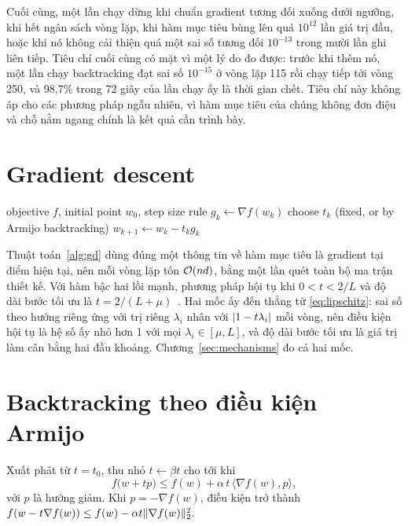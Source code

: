 Cuối cùng, một lần chạy dừng khi chuẩn gradient tương đối xuống dưới ngưỡng, khi
hết ngân sách vòng lặp, khi hàm mục tiêu bùng lên quá $10^{12}$ lần giá trị đầu,
hoặc khi nó không cải thiện quá một sai số tương đối $10^{-13}$ trong mười lần
ghi liên tiếp. Tiêu chí cuối cùng có mặt vì một lý do đo được: trước khi thêm nó,
một lần chạy backtracking đạt sai số $10^{-15}$ ở vòng lặp 115 rồi chạy tiếp tới
vòng 250, và 98,7\% trong 72 giây của lần chạy ấy là thời gian chết. Tiêu chí này
không áp cho các phương pháp ngẫu nhiên, vì hàm mục tiêu của chúng không đơn điệu
và chỗ nằm ngang chính là kết quả cần trình bày.

\section{Gradient descent}
\label{sec:impl-gd}

\begin{algorithm}[tp]
  \caption{Gradient descent}
  \label{alg:gd}
  \begin{algorithmic}[1]
    \Require objective $f$, initial point $w_0$, step size rule
      \State $g_k \gets \nabla f(w_k)$
      \State choose $t_k$ (fixed, or by Armijo backtracking)
      \State $w_{k+1} \gets w_k - t_k g_k$
    \EndFor
  \end{algorithmic}
\end{algorithm}

Thuật toán~\ref{alg:gd} dùng đúng một thông tin về hàm mục tiêu là gradient tại
điểm hiện tại, nên mỗi vòng lặp tốn $\mathcal{O}(nd)$, bằng một lần quét toàn bộ ma
trận thiết kế. Với hàm bậc hai lồi mạnh, phương pháp hội tụ khi $0 < t < 2/L$ và
độ dài bước tối ưu là $t = 2/(L+\mu)$~\cite{nesterov2018lectures}. Hai mốc ấy đến
thẳng từ \eqref{eq:lipschitz}: sai số theo hướng riêng ứng với trị riêng
$\lambda_i$ nhân với $\lvert1 - t\lambda_i\rvert$ mỗi vòng, nên điều kiện hội tụ là hệ
số ấy nhỏ hơn 1 với mọi $\lambda_i \in [\mu, L]$, và độ dài bước tối ưu là giá
trị làm cân bằng hai đầu khoảng. Chương~\ref{sec:mechanisms} đo cả hai mốc.

\section{Backtracking theo điều kiện Armijo}
\label{sec:impl-armijo}

Xuất phát từ $t = t_0$, thu nhỏ $t \leftarrow \beta t$ cho tới
khi~\cite{nocedal2006numerical}
%
\begin{equation}
  \label{eq:armijo}
  f\bigl( w + t p \bigr) \le f(w) + \alpha \, t \, \langle \nabla f(w), p \rangle ,
\end{equation}
%
với $p$ là hướng giảm. Khi $p = -\nabla f(w)$, điều kiện trở thành
$f(w - t \nabla f(w)) \le f(w) - \alpha t \lVert\nabla f(w)\rVert_{2}^{2}$.

